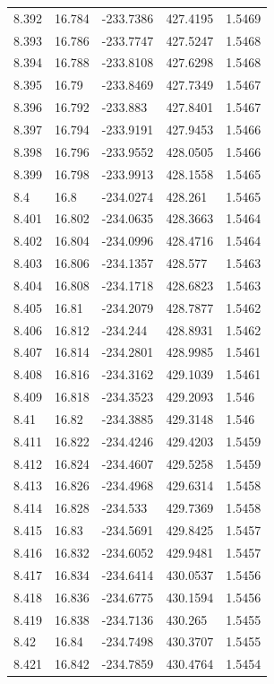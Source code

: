 \begin{tabular}{lllll}
8.392 & 16.784 & -233.7386 & 427.4195 & 1.5469 \\
8.393 & 16.786 & -233.7747 & 427.5247 & 1.5468 \\
8.394 & 16.788 & -233.8108 & 427.6298 & 1.5468 \\
8.395 & 16.79 & -233.8469 & 427.7349 & 1.5467 \\
8.396 & 16.792 & -233.883 & 427.8401 & 1.5467 \\
8.397 & 16.794 & -233.9191 & 427.9453 & 1.5466 \\
8.398 & 16.796 & -233.9552 & 428.0505 & 1.5466 \\
8.399 & 16.798 & -233.9913 & 428.1558 & 1.5465 \\
8.4 & 16.8 & -234.0274 & 428.261 & 1.5465 \\
8.401 & 16.802 & -234.0635 & 428.3663 & 1.5464 \\
8.402 & 16.804 & -234.0996 & 428.4716 & 1.5464 \\
8.403 & 16.806 & -234.1357 & 428.577 & 1.5463 \\
8.404 & 16.808 & -234.1718 & 428.6823 & 1.5463 \\
8.405 & 16.81 & -234.2079 & 428.7877 & 1.5462 \\
8.406 & 16.812 & -234.244 & 428.8931 & 1.5462 \\
8.407 & 16.814 & -234.2801 & 428.9985 & 1.5461 \\
8.408 & 16.816 & -234.3162 & 429.1039 & 1.5461 \\
8.409 & 16.818 & -234.3523 & 429.2093 & 1.546 \\
8.41 & 16.82 & -234.3885 & 429.3148 & 1.546 \\
8.411 & 16.822 & -234.4246 & 429.4203 & 1.5459 \\
8.412 & 16.824 & -234.4607 & 429.5258 & 1.5459 \\
8.413 & 16.826 & -234.4968 & 429.6314 & 1.5458 \\
8.414 & 16.828 & -234.533 & 429.7369 & 1.5458 \\
8.415 & 16.83 & -234.5691 & 429.8425 & 1.5457 \\
8.416 & 16.832 & -234.6052 & 429.9481 & 1.5457 \\
8.417 & 16.834 & -234.6414 & 430.0537 & 1.5456 \\
8.418 & 16.836 & -234.6775 & 430.1594 & 1.5456 \\
8.419 & 16.838 & -234.7136 & 430.265 & 1.5455 \\
8.42 & 16.84 & -234.7498 & 430.3707 & 1.5455 \\
8.421 & 16.842 & -234.7859 & 430.4764 & 1.5454 \\

\end{tabular}

